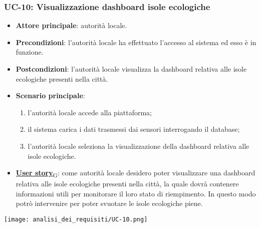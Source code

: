 \subsubsection{UC-10: Visualizzazione dashboard isole ecologiche}
\begin{itemize}
	\item \textbf{Attore principale}: autorità locale.
	\item \textbf{Precondizioni}: l'autorità locale ha effettuato l'accesso al sistema ed esso è in funzione.
	\item \textbf{Postcondizioni}: l'autorità locale visualizza la dashboard relativa
	      alle isole ecologiche presenti nella città.
	\item \textbf{Scenario principale}:
	      \begin{enumerate}
		      \item l'autorità locale accede alla piattaforma;
		      \item il sistema carica i dati trasmessi dai sensori interrogando il database;
		      \item l'autorità locale seleziona la visualizzazione della dashboard relativa alle isole ecologiche.
	      \end{enumerate}
	\item \href{https://7last.github.io/docs/rtb/documentazione-interna/glossario\#user-story}{\textbf{User story}\textsubscript{G}}:
	      come autorità locale desidero poter visualizzare una dashboard relativa alle isole ecologiche presenti nella città, la quale
	      dovrà contenere informazioni utili per monitorare il loro stato di riempimento. In questo modo potrò intervenire
	      per poter svuotare le isole ecologiche piene.
\end{itemize}
\begin{center}
	\texttt{[image: analisi\_dei\_requisiti/UC-10.png]}
\end{center}


